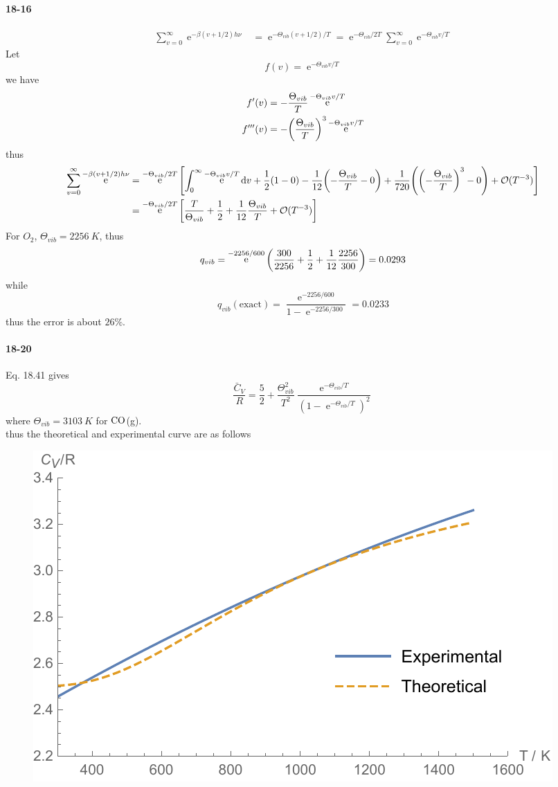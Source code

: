 \documentclass[a4paper]{article}
\DeclareMathOperator{\intinf}{\int_0^\infty}
\DeclareMathOperator{\e}{\mathrm{e}}
\newcommand{\ex}[1]{\paragraph{18-#1}}
\numberwithin{equation}{section}
\begin{document}
\ex{16}
\begin{align}
\sum_{v=0}^\infty \e^{-\beta(v+1/2)h\nu} &= \e^{-\Theta_{vib}(v+1/2)/T} = \e^{-\Theta_{vib}/2T} \sum_{v=0}^\infty \e^{-\Theta_{vib} v/T} 
\end{align}
Let
\begin{equation}\label{key}
f(v) = \e^{-\Theta_{vib} v/T} 
\end{equation}
we have
\begin{align}
f'(v) &= -\dfrac{\Theta_{vib}}{T}\e^{-\Theta_{vib} v/T} \notag\\
f'''(v) &= -\qty(\dfrac{\Theta_{vib}}{T})^3 \e^{-\Theta_{vib} v/T} 
\end{align}
thus
\begin{align}
\sum_{v=0}^\infty \e^{-\beta(v+1/2)h\nu} &= \e^{-\Theta_{vib}/2T} \qty[\intinf \e^{-\Theta_{vib} v/T} \dd v + \dfrac{1}{2}(1-0) - \dfrac{1}{12}\qty(-\dfrac{\Theta_{vib}}{T} - 0) + \dfrac{1}{720}\qty(\qty(-\dfrac{\Theta_{vib}}{T})^3 - 0) + \mathcal{O}(T^{-3})] \notag\\
&= \e^{-\Theta_{vib}/2T} \qty[\dfrac{T}{\Theta_{vib}} + \dfrac{1}{2} + \dfrac{1}{12}\dfrac{\Theta_{vib}}{T} +  \mathcal{O}(T^{-3})] 
\end{align}
For $ O_2 $, $ \Theta_{vib} = \SI{2256}{K} $, thus
\begin{equation}\label{key}
q_{vib} = \e^{-2256/600}\qty(\dfrac{300}{2256} + \dfrac{1}{2} + \dfrac{1}{12}\dfrac{2256}{300}) = 0.0293
\end{equation}
while
\begin{equation}\label{key}
q_{vib}(\text{exact}) = \dfrac{\e^{-2256/600}}{1 - \e^{-2256/300}} = 0.0233
\end{equation}
thus the error is about $ 26\% $.

\ex{20}
Eq. 18.41 gives
\begin{equation}\label{key}
\dfrac{\bar{C}_V}{R} = \dfrac{5}{2} + \dfrac{\Theta_{vib}^2}{T^2}\dfrac{\e^{-\Theta_{vib} /T}}{(1 - \e^{-\Theta_{vib} /T})^2}
\end{equation}
where $ \Theta_{vib} = \SI{3103}{K} $ for $ \ce{CO} $(g).\\
thus the theoretical and experimental curve are as follows
\begin{figure}[H]
	\centering
	\includegraphics[width=0.65\linewidth]{18-20.pdf}
\end{figure}
\end{document}

